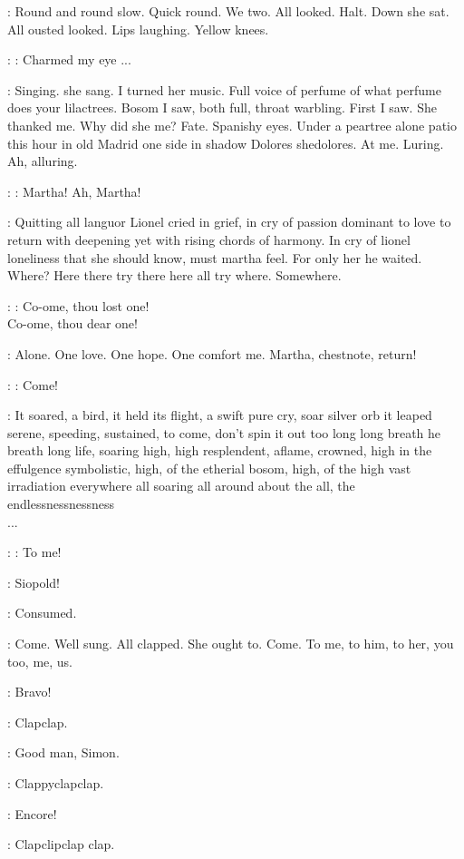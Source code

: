 \BloomInt:
Round and round slow. Quick round. We two. All looked. Halt. Down she
sat. All ousted looked. Lips laughing. Yellow knees.

\Simon:
\Song:
Charmed my eye ...

\BloomInt:
Singing.
 she sang.
I turned her music. Full voice of perfume
of what perfume does your lilactrees. Bosom I saw, both full, throat
warbling. First I saw. She thanked me. Why did she me? Fate. Spanishy
eyes. Under a peartree alone patio this hour in old Madrid one side in
shadow Dolores shedolores. At me. Luring. Ah, alluring.

\Simon:
\Song:
Martha! Ah, Martha!

\BloomInt:
Quitting all languor Lionel cried in grief, in cry of passion dominant
to love to return with deepening yet with rising chords of harmony. In cry
of lionel loneliness that she should know, must martha feel. For only her
he waited. Where? Here there try there here all try where. Somewhere.

\Simon:
\Song:
Co-ome, thou lost one!%
\\
Co-ome, thou dear one!

\BloomInt:
Alone. One love. One hope. One comfort me.
Martha, chestnote, return!

\Simon:
\Song:
Come!

:
It soared, a bird, it held its flight, a swift pure cry, soar silver orb
it leaped serene, speeding, sustained, to come, don't spin it out too long
long breath he breath long life, soaring high, high resplendent, aflame,
crowned, high in the effulgence symbolistic, high, of the etherial bosom,
high, of the high vast irradiation everywhere all soaring all around about
the all, the endlessnessnessness%
\\
...

\Simon:
\Song:
To me!

\BloomInt:
Siopold!

\BloomInt:
Consumed.

\BloomInt:
Come. Well sung. All clapped. She ought to. Come. To me, to him, to
her, you too, me, us.

\Lenehan:
Bravo!

:
Clapclap.

\Dollard:
Good man, Simon.

:
Clappyclapclap.

\Cowley:
Encore!

:
Clapclipclap clap.

